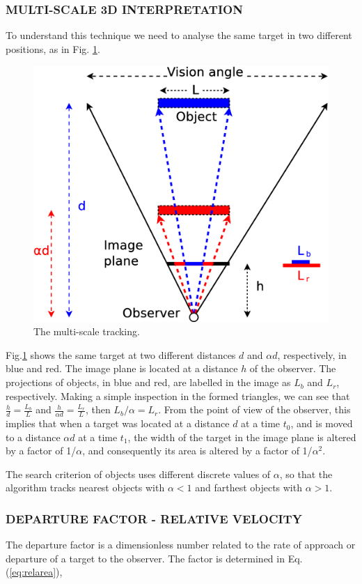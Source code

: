 \subsubsection{MULTI-SCALE 3D INTERPRETATION}
To understand this technique we need to analyse the same target in 
two different positions, as in Fig. \ref{fig:multiscale3d}.

\begin{figure}[H]
\centering
  \includegraphics[width=.7\columnwidth]{images/Diagrama3.eps}
  \caption{The multi-scale tracking.}
  \label{fig:multiscale3d}
\end{figure}

Fig.\ref{fig:multiscale3d} shows the same target at two different distances $d$ and $\alpha d$, respectively, in blue and red.
The image plane is located at a distance $h$ of the observer.
The projections of objects, in blue and red, are labelled in the image as
$L_b$ and $L_r$, respectively. Making a simple inspection in the
formed triangles, we can see that $\frac{h}{d}=\frac{L_b}{L}$ and 
$\frac{h}{\alpha d}=\frac{L_r}{L}$, then $L_b/\alpha= L_r$. 
From the point of view of the observer, this implies that when a target 
was located at a distance $d$ at a time $t_0$,  and is moved to a distance $\alpha d$ at a time $t_1$, 
the width of the target in the image plane is altered by a factor of 1/$\alpha$, 
and consequently its area is altered by a factor of 1/$\alpha^2$.

The search criterion of objects uses different discrete values of $\alpha$, so that 
the algorithm tracks nearest objects with $\alpha<1$ and farthest objects  with $\alpha>1$.


\subsubsection{DEPARTURE FACTOR - RELATIVE VELOCITY}
The departure factor is a dimensionless number related to the rate of approach 
or departure of a target to the observer. The factor
is determined in Eq. (\ref{eq:relarea}),

